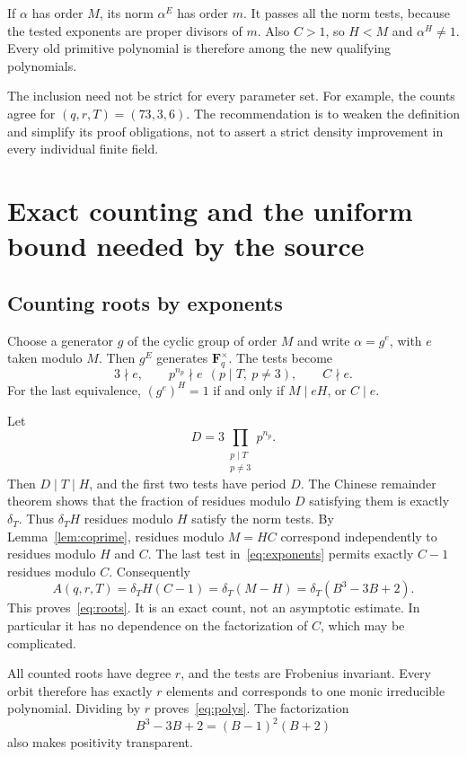 \documentclass[11pt,a4paper]{article}
\newcommand{\F}{\mathbf F}
\theoremstyle{definition}
\theoremstyle{remark}
\begin{document}
If $\alpha$ has order $M$, its norm $\alpha^E$ has order $m$. It passes
all the norm tests, because the tested exponents are proper divisors of
$m$. Also $C>1$, so $H<M$ and $\alpha^H\ne1$. Every old primitive
polynomial is therefore among the new qualifying polynomials.

The inclusion need not be strict for every parameter set. For example,
the counts agree for $(q,r,T)=(73,3,6)$. The recommendation is to weaken
the definition and simplify its proof obligations, not to assert a strict
density improvement in every individual finite field.

\section{Exact counting and the uniform bound needed by the source}
\label{sec:count}

\subsection{Counting roots by exponents}

Choose a generator $g$ of the cyclic group of order $M$ and write
$\alpha=g^e$, with $e$ taken modulo $M$. Then $g^E$ generates
$\F_q^{\times}$. The tests become
\begin{equation}
 3\nmid e,\qquad p^{n_p}\nmid e\ \ (p\mid T,\ p\ne3),
 \qquad C\nmid e.
 \label{eq:exponents}
\end{equation}
For the last equivalence, $(g^e)^H=1$ if and only if $M\mid eH$, or
$C\mid e$.

Let
\[
 D=3\prod_{\substack{p\mid T\\p\ne3}}p^{n_p}.
\]
Then $D\mid T\mid H$, and the first two tests have period $D$.
The Chinese remainder theorem shows that the fraction of residues modulo
$D$ satisfying them is exactly $\delta_T$. Thus $\delta_T H$ residues
modulo $H$ satisfy the norm tests. By Lemma~\ref{lem:coprime}, residues
modulo $M=HC$ correspond independently to residues modulo $H$ and $C$.
The last test in~\eqref{eq:exponents} permits exactly $C-1$ residues
modulo $C$. Consequently
\[
 A(q,r,T)=\delta_T H(C-1)=\delta_T(M-H)
         =\delta_T(B^3-3B+2).
\]
This proves~\eqref{eq:roots}. It is an exact count, not an asymptotic
estimate. In particular it has no dependence on the factorization of
$C$, which may be complicated.

All counted roots have degree $r$, and the tests are Frobenius invariant.
Every orbit therefore has exactly $r$ elements and corresponds to one
monic irreducible polynomial. Dividing by $r$ proves~\eqref{eq:polys}.
The factorization
\[
 B^3-3B+2=(B-1)^2(B+2)
\]
also makes positivity transparent.
\end{document}
